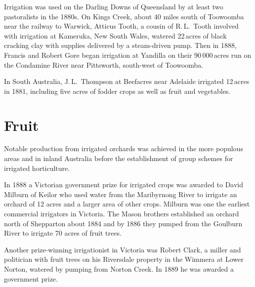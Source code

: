 Irrigation was used on the Darling Downs  of
Queensland  by at least two pastoralists in the
1880s.  On Kings Creek,  about 40 miles south of
Toowoomba  near the railway to Warwick, Atticus
Tooth,  a cousin of R.\,L.~Tooth involved with
irrigation at Kameruka, New South Wales, watered 22\,acres of black
cracking clay with supplies delivered by a steam-driven
pump.  Then in 1888, Francis and Robert Gore
began irrigation at Yandilla  on their
90\,000\,acres run on the Condamine River  near
Pittsworth,  south-west of
Too\-woom\-ba.

In South Australia, J.\,L.~Thompson  at
Beefacres near Adelaide irrigated 12\,acres in 1881, including five
acres of fodder crops as well as fruit and vegetables.

\section*{Fruit}

Notable production from irrigated orchards was achieved in the more
populous areas and in inland Australia before the establishment of
gr\-oup schemes for irrigated horticulture.

In 1888 a Victorian government prize  for
irrigated crops was awarded to David Milburn  of
Keilor who used water from the Maribyrnong River
 to irrigate an orchard  of 12
acres and a larger area of other crops.  Milburn was one the earliest
commercial irrigators in Victoria.  The Mason brothers established an
orchard north of Shepparton  about 1884 and by
1886 they pumped from the Goulburn River  to
irrigate 70 acres of fruit trees.

Another prize-winning irrigationist in Victoria was Robert Clark,
\index{Clark, R.}  a
miller and politician with fruit trees on his Riversdale property in
the Wimmera at Lower Norton, watered by pumping from Norton Creek.  In
1889 he was awarded a government prize.

